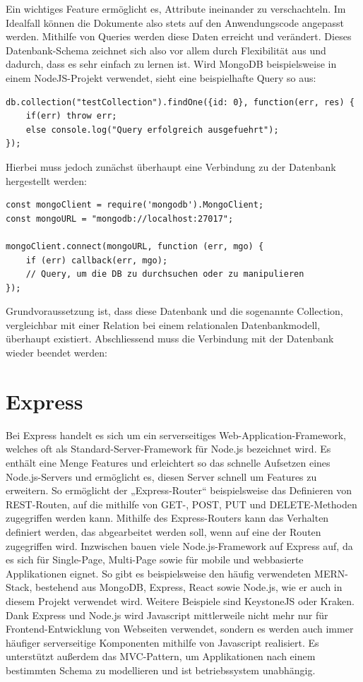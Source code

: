 \documentclass[12pt,a4paper]{report}
\begin{document}
\noindent
Ein wichtiges Feature ermöglicht es, Attribute ineinander zu verschachteln. 
Im Idealfall können die Dokumente also stets auf den Anwendungscode angepasst werden. Mithilfe von Queries werden diese Daten erreicht und verändert. Dieses Datenbank-Schema zeichnet sich also vor allem durch Flexibilität aus und dadurch, dass es sehr einfach zu lernen ist. 
Wird MongoDB beispielsweise in einem NodeJS-Projekt verwendet, sieht eine beispielhafte Query so aus: 

\begin{verbatim}
db.collection("testCollection").findOne({id: 0}, function(err, res) {
	if(err) throw err;
	else console.log("Query erfolgreich ausgefuehrt");
});
\end{verbatim}

Hierbei muss jedoch zunächst überhaupt eine Verbindung zu der Datenbank hergestellt werden: 

\begin{verbatim}
const mongoClient = require('mongodb').MongoClient;
const mongoURL = "mongodb://localhost:27017";

mongoClient.connect(mongoURL, function (err, mgo) {
    if (err) callback(err, mgo);
    // Query, um die DB zu durchsuchen oder zu manipulieren
});
\end{verbatim}

Grundvoraussetzung ist, dass diese Datenbank und die sogenannte Collection, vergleichbar mit einer Relation bei einem relationalen Datenbankmodell, überhaupt existiert.
Abschliessend muss die Verbindung mit der Datenbank wieder beendet werden:

\section{Express}
Bei Express handelt es sich um ein serverseitiges Web-Application-Framework, welches oft als Standard-Server-Framework für Node.js bezeichnet wird. Es enthält eine Menge Features und erleichtert so das schnelle Aufsetzen eines Node.js-Servers und ermöglicht es, diesen Server schnell um Features zu erweitern. 
So ermöglicht der „Express-Router“ beispielsweise das Definieren von REST-Routen, auf die mithilfe von GET-, POST, PUT und DELETE-Methoden zugegriffen werden kann. Mithilfe des Express-Routers kann das Verhalten definiert werden, das abgearbeitet werden soll, wenn auf eine der Routen zugegriffen wird. 
Inzwischen bauen viele Node.js-Framework auf Express auf, da es sich für Single-Page, Multi-Page sowie für mobile und webbasierte Applikationen eignet. So gibt es beispielsweise den häufig verwendeten MERN-Stack, bestehend aus MongoDB, Express, React sowie Node.js, wie er auch in diesem Projekt verwendet wird. Weitere Beispiele sind KeystoneJS oder Kraken.
Dank Express und Node.js wird Javascript mittlerweile nicht mehr nur für Frontend-Entwicklung von Webseiten verwendet, sondern es werden auch immer häufiger serverseitige Komponenten mithilfe von Javascript realisiert.
Es unterstützt außerdem das MVC-Pattern, um Applikationen nach einem bestimmten Schema zu modellieren und ist betriebssystem unabhängig. 
\end{document}
